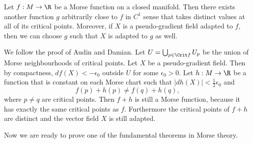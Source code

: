 \begin{prop}
    Let $f: M \to  \R$ be a Morse function on a closed manifold.
    Then there exists another function $g$ arbitrarily close to $f$ in $C^{1}$ sense that takes distinct values at all of its critical points.
    Moreover, if $X$ is a pseudo-gradient field adapted to  $f$,
    then we can choose $g$ such that $X$ is adapted to $g$ as well.
\end{prop}
\begin{myproof}
    We follow the proof of Audin and Damian.
    Let $U = \bigcup_{p \in \Crit f} U_p$ be the union of Morse neighbourhoods of critical points.
    Let $X$ be a pseudo-gradient field.
    Then by compactness, $df(X) < - \epsilon_0$ outside $U$ for some $\epsilon_0>0$.
    Let $h: M \to  \R$ be a function that is constant on each Morse chart such that $|dh(X)| < \frac{1}{2}\epsilon_0$ and
    \[
        f(p) + h(p) \neq f(q) + h(q), 
    \] 
    where $p \neq q$ are critical points.
    Then $f+h$ is still a Morse function, because it has exactly the same critical points as $f$.
    Furthermore the critical points of $f + h$ are distinct and the vector field $X$ is still adapted.
\end{myproof}

Now we are ready to prove one of the fundamental theorems in Morse theory.

